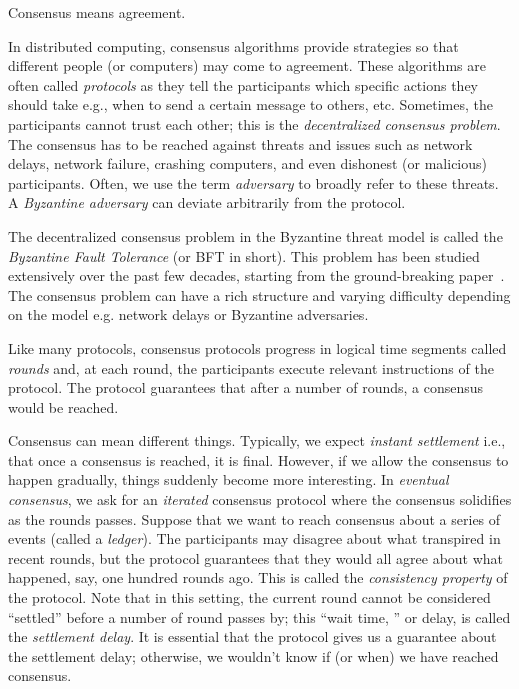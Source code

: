 




Consensus means agreement.

In distributed computing, 
consensus algorithms provide strategies 
so that different people (or computers) 
may come to agreement. 
These algorithms are often called \emph{protocols} as they 
tell the participants which specific actions they should take 
e.g., when to send a certain message to others, etc. 
Sometimes, the participants cannot trust each other; 
this is the \emph{decentralized consensus problem}. 
The consensus has to be reached against threats and issues such as 
network delays, network failure, crashing computers, and even 
dishonest (or malicious) participants. 
Often, we use the term \emph{adversary} to broadly refer to these threats. 
A \emph{Byzantine adversary} can deviate arbitrarily from the protocol. 


The decentralized consensus problem in the Byzantine threat model 
is called the \emph{Byzantine Fault Tolerance} (or BFT in short). 
This problem has been studied extensively over the past few decades, 
starting from the ground-breaking paper~\citet{BFT}. 
The consensus problem can have a rich structure and varying difficulty 
depending on the model e.g. network delays or Byzantine adversaries. 

Like many protocols, consensus protocols 
progress in logical time segments called \emph{rounds} 
and, at each round, the participants execute relevant instructions of the protocol. 
The protocol guarantees that after a number of rounds, 
a consensus would be reached. 

Consensus can mean different things. 
Typically, we expect \emph{instant settlement} 
i.e., that once a consensus is reached, 
it is final. 
However, if we allow the consensus to happen gradually, 
things suddenly become more interesting.
In \emph{eventual consensus}, 
we ask for an \emph{iterated} consensus protocol 
where the consensus solidifies as the rounds passes. 
Suppose that we want to reach consensus about a series of events 
(called a \emph{ledger}). 
The participants may disagree about what transpired in recent rounds, 
but the protocol guarantees that they would all agree about 
what happened, say, one hundred rounds ago. 
This is called the \emph{consistency property} of the protocol. 
Note that in this setting, 
the current round cannot be considered ``settled'' 
before a number of round passes by; 
this ``wait time, '' or delay, is called the \emph{settlement delay}. 
It is essential that the protocol gives us a guarantee 
about the settlement delay;
otherwise, we wouldn't know if (or when) we have reached consensus.

